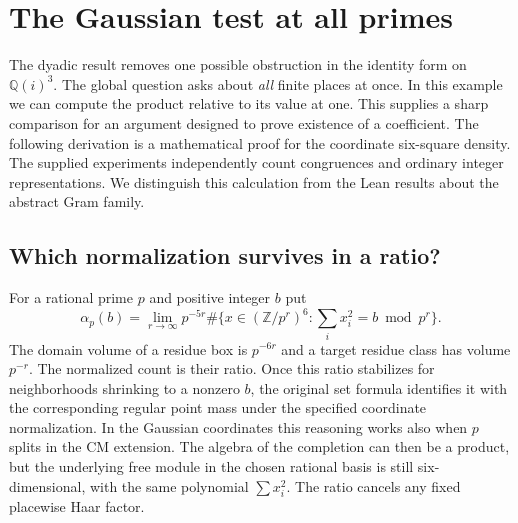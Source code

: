 \documentclass[12pt,letterpaper]{article}
\begin{document}
\section{The Gaussian test at all primes}
The dyadic result removes one possible obstruction in the identity form on $\mathbb Q(i)^3$. The global question asks about \emph{all} finite places at once. In this example we can compute the product relative to its value at one. This supplies a sharp comparison for an argument designed to prove existence of a coefficient. The following derivation is a mathematical proof for the coordinate six-square density. The supplied experiments independently count congruences and ordinary integer representations. We distinguish this calculation from the Lean results about the abstract Gram family.
\subsection{Which normalization survives in a ratio?}
For a rational prime $p$ and positive integer $b$ put
\[
 \alpha_p(b)=\lim_{r\to\infty}p^{-5r}
    \#\{x\in(\mathbb Z/p^r)^6:\textstyle\sum_i x_i^2=b\bmod p^r\}.
\]
The domain volume of a residue box is $p^{-6r}$ and a target residue class has volume $p^{-r}$. The normalized count is their ratio. Once this ratio stabilizes for neighborhoods shrinking to a nonzero $b$, the original set formula identifies it with the corresponding regular point mass under the specified coordinate normalization. In the Gaussian coordinates this reasoning works also when $p$ splits in the CM extension. The algebra of the completion can then be a product, but the underlying free module in the chosen rational basis is still six-dimensional, with the same polynomial $\sum x_i^2$. The ratio cancels any fixed placewise Haar factor.
\end{document}
